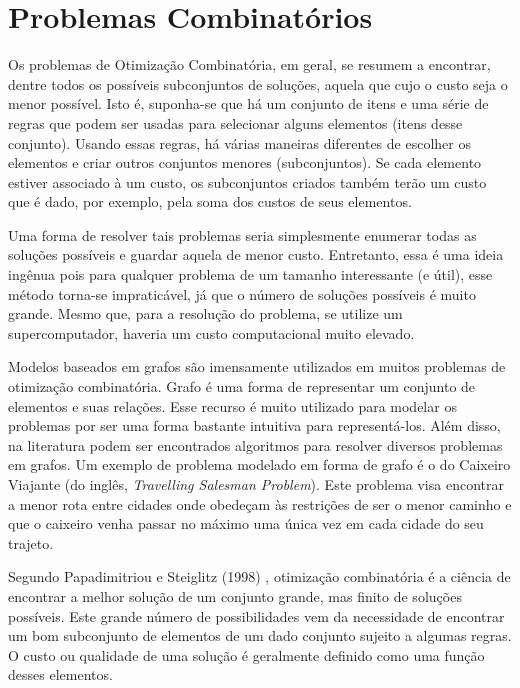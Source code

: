\chapter{Problemas Combinatórios}



Os problemas de Otimização Combinatória, em geral, se resumem a encontrar, dentre todos os possíveis subconjuntos de soluções, aquela que cujo o custo seja o menor possível. Isto é, suponha-se que há um conjunto de itens e uma série de regras que podem ser usadas para selecionar alguns elementos (itens desse conjunto). Usando essas regras, há várias maneiras diferentes de escolher os elementos e criar outros conjuntos menores (subconjuntos). Se cada elemento estiver associado à um custo, os subconjuntos criados também terão um custo que é dado, por exemplo, pela soma dos custos de seus elementos.

Uma forma de resolver tais problemas seria simplesmente enumerar todas as soluções possíveis e guardar aquela de menor custo. Entretanto, essa é uma ideia ingênua pois para qualquer problema de um tamanho interessante (e útil), esse método torna-se impraticável, já que o número de soluções possíveis é muito grande. Mesmo que, para a resolução do problema, se utilize um supercomputador, haveria um custo computacional muito elevado.

Modelos baseados em grafos são imensamente utilizados em muitos problemas de otimização combinatória. Grafo é uma forma de representar um conjunto de elementos e suas relações. Esse recurso é muito utilizado para modelar os problemas por ser uma forma bastante intuitiva para representá-los. Além disso, na literatura podem ser encontrados algoritmos para resolver diversos problemas em grafos. Um exemplo de problema modelado em forma de grafo é o do Caixeiro Viajante (do inglês, \textit{Travelling Salesman Problem}). Este problema visa encontrar a menor rota entre cidades onde obedeçam às restrições de ser o menor caminho e que o caixeiro venha passar no máximo uma única vez em cada cidade do seu trajeto.

Segundo Papadimitriou e Steiglitz (1998) \cite{papadimitriou1982combinatorial}, otimização combinatória é a ciência de encontrar a melhor solução de um conjunto grande, mas finito de soluções possíveis. Este grande número de possibilidades vem da necessidade de encontrar um bom subconjunto de elementos de um dado conjunto sujeito a algumas regras. O custo ou qualidade de uma solução é geralmente definido como uma função desses elementos.

